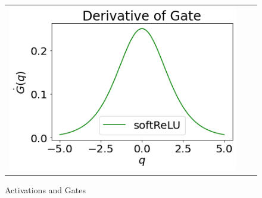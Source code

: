 \begin{figure}[h]
\begin{minipage}{0.78\columnwidth}
{\begin{tabular}{ccc}
\includegraphics[scale=0.4]{figs/der-gate.png}
\end{tabular}
}
\end{minipage}
\caption{Activations and Gates}
\label{fig:actgate}
\end{figure}
